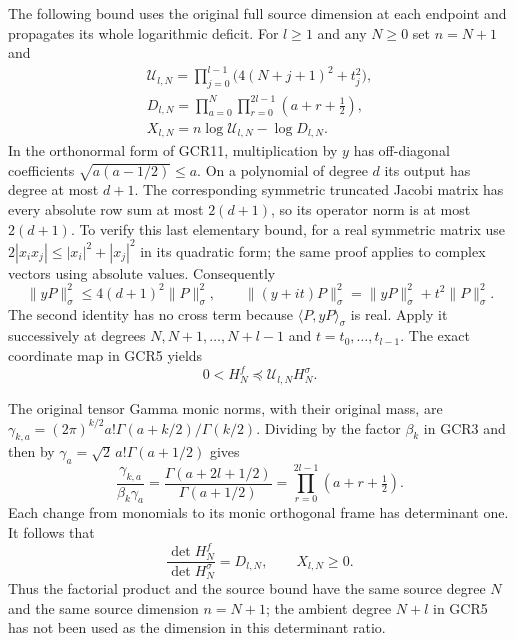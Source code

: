 The following bound uses the original full source dimension at
each endpoint and propagates its whole logarithmic deficit.
For $l\geq1$ and any $N\geq0$ set $n=N+1$ and
\[
\begin{gathered}
 \mathscr U_{l,N}
    =\prod_{j=0}^{l-1}\bigl(4(N+j+1)^2+t_j^2\bigr),\\
 D_{l,N}
    =\prod_{a=0}^{N}\prod_{r=0}^{2l-1}(a+r+\tfrac12),\\
 X_{l,N}=n\log\mathscr U_{l,N}-\log D_{l,N}.
\end{gathered}\tag{GCR28}
\]
In the orthonormal form of GCR11, multiplication by $y$ has
off-diagonal coefficients $\sqrt{a(a-1/2)}\leq a$.
On a polynomial of degree $d$ its output has degree at most
$d+1$. The corresponding symmetric truncated Jacobi matrix
has every absolute row sum at most $2(d+1)$, so its operator
norm is at most $2(d+1)$. To verify this last elementary bound,
for a real symmetric matrix use
$2|x_i x_j|\leq |x_i|^2+|x_j|^2$ in its quadratic form;
the same proof applies to complex vectors using absolute values.
Consequently
\[
 \|yP\|_\sigma^2\leq4(d+1)^2\|P\|_\sigma^2,\qquad
 \|(y+it)P\|_\sigma^2
      =\|yP\|_\sigma^2+t^2\|P\|_\sigma^2.
\]
The second identity has no cross term because
$\langle P,yP\rangle_\sigma$ is real. Apply it successively
at degrees $N,N+1,\ldots,N+l-1$ and $t=t_0,\ldots,t_{l-1}$.
The exact coordinate map in GCR5 yields
\[
 0<H_N^f\preceq\mathscr U_{l,N}H_N^\sigma .
\tag{GCR29}
\]

The original tensor Gamma monic norms, with their original mass,
are
$\gamma_{k,a}=(2\pi)^{k/2}a!\Gamma(a+k/2)/\Gamma(k/2)$.
Dividing by the factor $\beta_k$ in GCR3 and then by
$\gamma_a=\sqrt2\,a!\Gamma(a+1/2)$ gives
\[
 \frac{\gamma_{k,a}}{\beta_k\gamma_a}
     =\frac{\Gamma(a+2l+1/2)}{\Gamma(a+1/2)}
     =\prod_{r=0}^{2l-1}(a+r+\tfrac12).
\]
Each change from monomials to its monic orthogonal frame has
determinant one. It follows that
\[
 \frac{\det H_N^f}{\det H_N^\sigma}=D_{l,N},\qquad
 X_{l,N}\geq0.
\tag{GCR30}
\]
Thus the factorial product and the source bound have the same
source degree $N$ and the same source dimension $n=N+1$;
the ambient degree $N+l$ in GCR5 has not been used as the
dimension in this determinant ratio.

